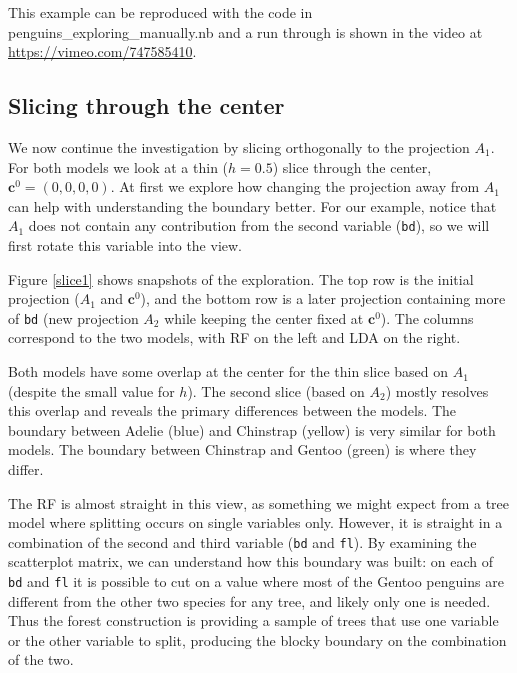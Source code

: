 \documentclass[]{interact}
\theoremstyle{plain}%
\theoremstyle{definition}
\theoremstyle{remark}
\begin{document}
This example can be reproduced with the code in
penguins\_exploring\_manually.nb and a run through is shown in the video
at \url{https://vimeo.com/747585410}.

\hypertarget{slicing-through-the-center}{%
\subsection{Slicing through the
center}\label{slicing-through-the-center}}

We now continue the investigation by slicing orthogonally to the
projection \(A_1\). For both models we look at a thin (\(h=0.5\)) slice
through the center, \(\mathbf{c}^0 = (0,0,0,0)\). At first we explore
how changing the projection away from \(A_1\) can help with
understanding the boundary better. For our example, notice that \(A_1\)
does not contain any contribution from the second variable
(\texttt{bd}), so we will first rotate this variable into the view.

Figure \ref{slice1} shows snapshots of the exploration. The top row is
the initial projection (\(A_1\) and \(\mathbf{c}^0\)), and the bottom
row is a later projection containing more of \texttt{bd} (new projection
\(A_2\) while keeping the center fixed at \(\mathbf{c}^0\)). The columns
correspond to the two models, with RF on the left and LDA on the right.

Both models have some overlap at the center for the thin slice based on
\(A_1\) (despite the small value for \(h\)). The second slice (based on
\(A_2\)) mostly resolves this overlap and reveals the primary
differences between the models. The boundary between Adelie (blue) and
Chinstrap (yellow) is very similar for both models. The boundary between
Chinstrap and Gentoo (green) is where they differ.

The RF is almost straight in this view, as something we might expect
from a tree model where splitting occurs on single variables only.
However, it is straight in a combination of the second and third
variable (\texttt{bd} and \texttt{fl}). By examining the scatterplot
matrix, we can understand how this boundary was built: on each of
\texttt{bd} and \texttt{fl} it is possible to cut on a value where most
of the Gentoo penguins are different from the other two species for any
tree, and likely only one is needed. Thus the forest construction is
providing a sample of trees that use one variable or the other variable
to split, producing the blocky boundary on the combination of the two.
\end{document}
